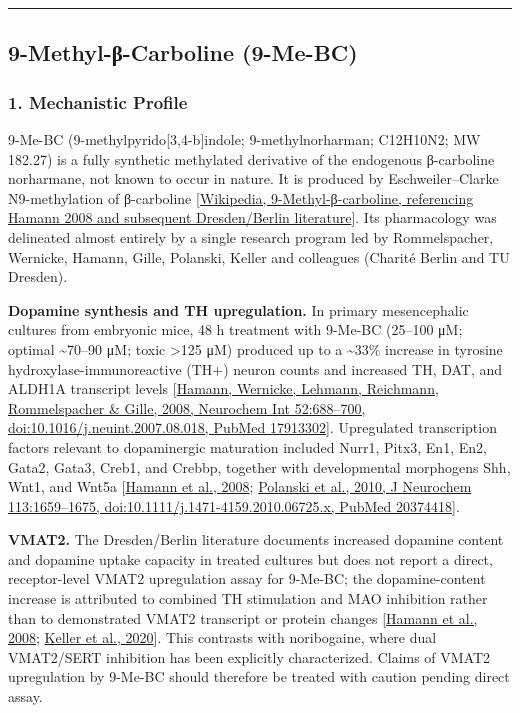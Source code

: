 \begin{center}\rule{0.5\linewidth}{0.5pt}\end{center}

\subsection{9-Methyl-β-Carboline (9-Me-BC)}\label{20_ibogaine-methyl-ux3b2-carboline-9-me-bc}

\subsubsection{1. Mechanistic Profile}\label{20_ibogaine-mechanistic-profile}

9-Me-BC (9-methylpyrido{[}3,4-b{]}indole; 9-methylnorharman; C12H10N2; MW 182.27) is a fully synthetic methylated derivative of the endogenous β-carboline norharmane, not known to occur in nature. It is produced by Eschweiler--Clarke N9-methylation of β-carboline {[}\href{https://en.wikipedia.org/wiki/9-Methyl-\%CE\%B2-carboline}{Wikipedia, 9-Methyl-β-carboline, referencing Hamann 2008 and subsequent Dresden/Berlin literature}{]}. Its pharmacology was delineated almost entirely by a single research program led by Rommelspacher, Wernicke, Hamann, Gille, Polanski, Keller and colleagues (Charité Berlin and TU Dresden).

\textbf{Dopamine synthesis and TH upregulation.} In primary mesencephalic cultures from embryonic mice, 48 h treatment with 9-Me-BC (25--100 μM; optimal \textasciitilde70--90 μM; toxic \textgreater125 μM) produced up to a \textasciitilde33\% increase in tyrosine hydroxylase-immunoreactive (TH+) neuron counts and increased TH, DAT, and ALDH1A transcript levels {[}\href{https://www.sciencedirect.com/science/article/abs/pii/S0197018607002483}{Hamann, Wernicke, Lehmann, Reichmann, Rommelspacher \& Gille, 2008, Neurochem Int 52:688--700, doi:10.1016/j.neuint.2007.08.018, PubMed 17913302}{]}. Upregulated transcription factors relevant to dopaminergic maturation included Nurr1, Pitx3, En1, En2, Gata2, Gata3, Creb1, and Crebbp, together with developmental morphogens Shh, Wnt1, and Wnt5a {[}\href{https://www.sciencedirect.com/science/article/abs/pii/S0197018607002483}{Hamann et al., 2008}; \href{https://pubmed.ncbi.nlm.nih.gov/20374418/}{Polanski et al., 2010, J Neurochem 113:1659--1675, doi:10.1111/j.1471-4159.2010.06725.x, PubMed 20374418}{]}.

\textbf{VMAT2.} The Dresden/Berlin literature documents increased dopamine content and dopamine uptake capacity in treated cultures but does not report a direct, receptor-level VMAT2 upregulation assay for 9-Me-BC; the dopamine-content increase is attributed to combined TH stimulation and MAO inhibition rather than to demonstrated VMAT2 transcript or protein changes {[}\href{https://www.sciencedirect.com/science/article/abs/pii/S0197018607002483}{Hamann et al., 2008}; \href{https://pmc.ncbi.nlm.nih.gov/articles/PMC8592951/}{Keller et al., 2020}{]}. This contrasts with noribogaine, where dual VMAT2/SERT inhibition has been explicitly characterized. Claims of VMAT2 upregulation by 9-Me-BC should therefore be treated with caution pending direct assay.

